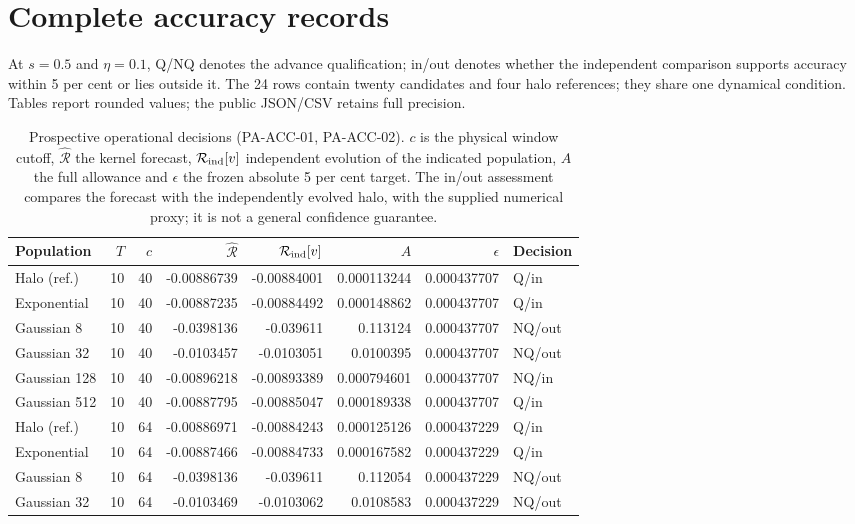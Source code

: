 \documentclass[fleqn,usenatbib]{mnras}
\begin{document}
\section{Complete accuracy records}\label{app-accuracy}

At \(s=0.5\) and \(\eta=0.1\), Q/NQ denotes the advance qualification; in/out denotes whether the independent comparison supports accuracy within 5 per cent or lies outside it. The 24 rows contain twenty candidates and four halo references; they share one dynamical condition. Tables report rounded values; the public JSON/CSV retains full precision.

\begin{table}
\centering
\caption{Prospective operational decisions (PA-ACC-01, PA-ACC-02). $c$ is the physical window cutoff, $\widehat{\mathcal R}$ the kernel forecast, $\mathcal R_{\rm ind}[v]$ independent evolution of the indicated population, $A$ the full allowance and $\epsilon$ the frozen absolute 5 per cent target. The in/out assessment compares the forecast with the independently evolved halo, with the supplied numerical proxy; it is not a general confidence guarantee.}\label{tab-acc}
\small
\setlength{\tabcolsep}{4pt}
\begin{tabular}{lrrrrrrl}
\toprule
Population & $T$ & $c$ & $\widehat{\mathcal R}$ & $\mathcal R_{\rm ind}[v]$ & $A$ & $\epsilon$ & Decision \\
\midrule
Halo (ref.) & 10 & 40 & -0.00886739 & -0.00884001 & 0.000113244 & 0.000437707 & Q/in \\
Exponential & 10 & 40 & -0.00887235 & -0.00884492 & 0.000148862 & 0.000437707 & Q/in \\
Gaussian 8 & 10 & 40 & -0.0398136 & -0.039611 & 0.113124 & 0.000437707 & NQ/out \\
Gaussian 32 & 10 & 40 & -0.0103457 & -0.0103051 & 0.0100395 & 0.000437707 & NQ/out \\
Gaussian 128 & 10 & 40 & -0.00896218 & -0.00893389 & 0.000794601 & 0.000437707 & NQ/in \\
Gaussian 512 & 10 & 40 & -0.00887795 & -0.00885047 & 0.000189338 & 0.000437707 & Q/in \\
Halo (ref.) & 10 & 64 & -0.00886971 & -0.00884243 & 0.000125126 & 0.000437229 & Q/in \\
Exponential & 10 & 64 & -0.00887466 & -0.00884733 & 0.000167582 & 0.000437229 & Q/in \\
Gaussian 8 & 10 & 64 & -0.0398136 & -0.039611 & 0.112054 & 0.000437229 & NQ/out \\
Gaussian 32 & 10 & 64 & -0.0103469 & -0.0103062 & 0.0108583 & 0.000437229 & NQ/out \\

\end{tabular}
\end{table}
\end{document}
